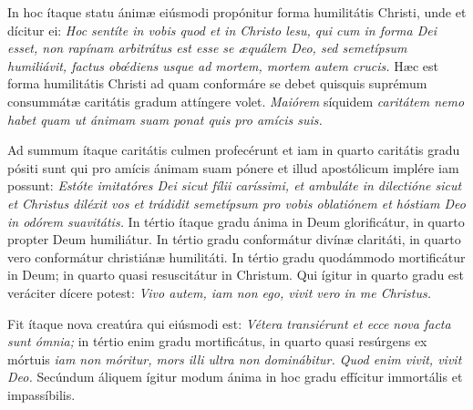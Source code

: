{\noindent In hoc ítaque statu ánimæ eiúsmodi propónitur forma humilitátis Christi, unde et dícitur ei: \textit{Hoc sentíte in vobis quod et in Christo lesu, qui cum in forma Dei esset, non rapínam arbitrátus est esse se æquálem Deo, sed semetípsum humiliávit, factus obœ́diens usque ad mortem, mortem autem crucis.} Hæc est forma humilitátis Christi ad quam conformáre se debet quisquis suprémum consummátæ caritátis gradum attíngere volet. \textit{Maiórem} síquidem \textit{caritátem nemo habet quam ut ánimam suam ponat quis pro amícis suis.}

\noindent Ad summum ítaque caritátis culmen profecérunt et iam in quarto caritátis gradu pósiti sunt qui pro amícis ánimam suam pónere et illud apostólicum implére iam possunt: \textit{Estóte imitatóres Dei sicut fílii caríssimi, et ambuláte in dilectióne sicut et Christus diléxit vos et trádidit semetípsum pro vobis oblatiónem et hóstiam Deo in odórem suavitátis.} In tértio ítaque gradu ánima in Deum glorificátur, in quarto propter Deum humiliátur. In tértio gradu conformátur divínæ claritáti, in quarto vero conformátur christiánæ humilitáti. In tértio gradu quodámmodo mortificátur in Deum; in quarto quasi resuscitátur in Christum. Qui ígitur in quarto gradu est veráciter dícere potest: \textit{Vivo autem, iam non ego, vivit vero in me Christus.}

\noindent Fit ítaque nova creatúra qui eiúsmodi est: \textit{Vétera transiérunt et ecce nova facta sunt ómnia;} in tértio enim gradu mortificátus, in quarto quasi resúrgens ex mórtuis \textit{iam non móritur, mors illi ultra non dominábitur. Quod enim vivit, vivit Deo.} Secúndum áliquem ígitur modum ánima in hoc gradu effícitur immortális et impassíbilis.

\vfill
\pagebreak

 

\vspace{-5mm}


\vfill
\pagebreak
}
\newcommand{\benedictus}{\pars{Canticum Zachariæ.} \scriptura{Mc. 9, 40}

\vspace{-4mm}

\antiphona{VIII G}{temporalia/ant-quienimnonest.gtex}

\vspace{-2mm}

\scriptura{Lc. 1, 68-79}

\vspace{-2mm}

\cantusSineNeumas
\initiumpsalmi{temporalia/benedictus-initium-viiisoll-G-auto.gtex}


 \Abardot{}}


